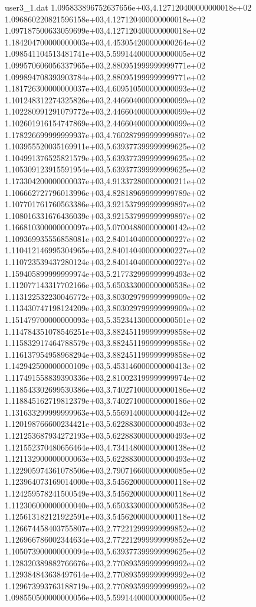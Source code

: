 \begin{filecontents}{user3_1.dat}
1.095833896752637656e+03,4.127120400000000018e+02
1.096860220821596158e+03,4.127120400000000018e+02
1.097187500633059699e+03,4.127120400000000018e+02
1.184204700000000003e+03,4.453054200000000264e+02
1.098541104513481741e+03,5.599144000000000005e+02
1.099570606056337965e+03,2.880951999999999771e+02
1.099894708393903784e+03,2.880951999999999771e+02
1.181726300000000037e+03,4.609510500000000093e+02
1.101248312274325826e+03,2.446604000000000099e+02
1.102280991291079772e+03,2.446604000000000099e+02
1.102601916154747869e+03,2.446604000000000099e+02
1.178226699999999937e+03,4.760287999999999897e+02
1.103955520035169911e+03,5.639377399999999625e+02
1.104991376525821579e+03,5.639377399999999625e+02
1.105309123915591954e+03,5.639377399999999625e+02
1.173304200000000037e+03,4.913372800000000211e+02
1.106662727796013996e+03,4.828189699999999789e+02
1.107701761760563386e+03,3.921537999999999897e+02
1.108016331676436039e+03,3.921537999999999897e+02
1.166810300000000097e+03,5.070048800000000142e+02
1.109369935556858081e+03,2.840140400000000227e+02
1.110412146995304965e+03,2.840140400000000227e+02
1.110723539437280124e+03,2.840140400000000227e+02
1.159405899999999974e+03,5.217732999999999493e+02
1.112077143317702166e+03,5.650333000000000538e+02
1.113122532230046772e+03,3.803029799999999909e+02
1.113430747198124209e+03,3.803029799999999909e+02
1.151479700000000093e+03,5.352341300000000501e+02
1.114784351078546251e+03,3.882451199999999858e+02
1.115832917464788579e+03,3.882451199999999858e+02
1.116137954958968294e+03,3.882451199999999858e+02
1.142942500000000109e+03,5.453146000000000413e+02
1.117491558839390336e+03,2.810023199999999974e+02
1.118543302699530386e+03,3.740271000000000186e+02
1.118845162719812379e+03,3.740271000000000186e+02
1.131633299999999963e+03,5.556914000000000442e+02
1.120198766600234421e+03,5.622883000000000493e+02
1.121253687934272193e+03,5.622883000000000493e+02
1.121552370480656464e+03,4.734148000000000138e+02
1.121132900000000063e+03,5.622883000000000493e+02
1.122905974361078506e+03,2.790716600000000085e+02
1.123964073169014000e+03,3.545620000000000118e+02
1.124259578241500549e+03,3.545620000000000118e+02
1.112306000000000040e+03,5.650333000000000538e+02
1.125613182121922591e+03,3.545620000000000118e+02
1.126674458403755807e+03,2.772212999999999852e+02
1.126966786002344634e+03,2.772212999999999852e+02
1.105073900000000094e+03,5.639377399999999625e+02
1.128320389882766676e+03,2.770893599999999992e+02
1.129384843638497614e+03,2.770893599999999992e+02
1.129673993763188719e+03,2.770893599999999992e+02
1.098550500000000056e+03,5.599144000000000005e+02

\end{filecontents}
